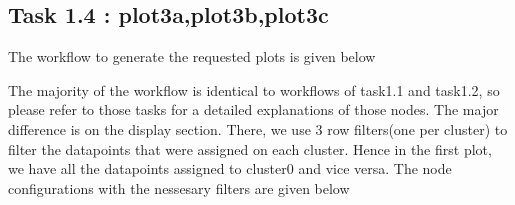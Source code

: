 \documentclass[11pt]{article}
\begin{document}
		 \subsection*{Task 1.4 : plot3a,plot3b,plot3c}
			
			
			The workflow to generate the requested plots is given below

			The majority of the workflow is identical to workflows of task1.1 and task1.2, so please refer to those tasks for a detailed explanations of those nodes. The major difference is on the display section. There, we use 3 row filters(one per cluster) to filter the datapoints that were assigned on each cluster. Hence in the first plot, we have all the datapoints assigned to cluster0 and vice versa. The node configurations with the nessesary filters are given below
			\iffalse
\end{document}
